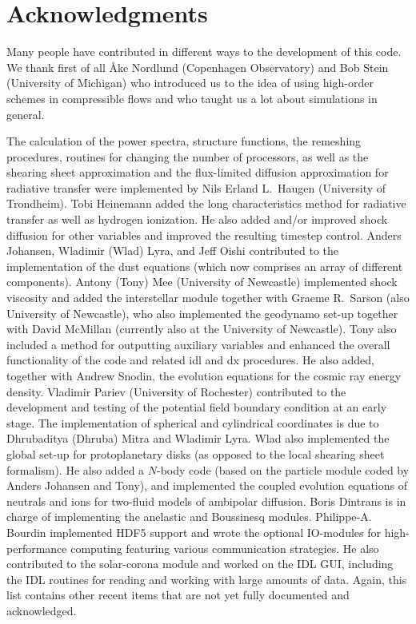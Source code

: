 \documentclass[\mydriver,12pt,twoside,notitlepage,a4paper]{article}
\begin{document}

\section*{Acknowledgments}

Many people have contributed in different ways to the development of this
code. We thank first of all {\AA}ke Nordlund (Copenhagen Observatory)
and Bob Stein (University of Michigan) who introduced us to the idea of
using high-order schemes in compressible flows and who taught us a lot
about simulations in general.

The calculation of the power spectra, structure functions,
the remeshing procedures,
routines for changing the number of processors, as well as
the shearing sheet approximation and the flux-limited diffusion
approximation for radiative transfer
were implemented by Nils Erland L.\ Haugen (University of Trondheim).
Tobi Heinemann added the long characteristics method for
radiative transfer as well as hydrogen ionization.
He also added and/or improved shock diffusion for other variables
and improved the resulting timestep control.
Anders Johansen, Wladimir (Wlad) Lyra, and Jeff Oishi contributed
to the implementation of
the dust equations (which now comprises an array of different components).
Antony (Tony) Mee (University of Newcastle) implemented shock viscosity
and added the interstellar module together with
Graeme R.\ Sarson (also University of Newcastle), who also implemented
the geodynamo set-up together with David McMillan
(currently also at the University of Newcastle).
Tony also included a method for outputting auxiliary variables and
enhanced the overall functionality of the code and related idl and dx
procedures.
He also added, together with Andrew Snodin, the evolution equations
for the cosmic ray energy density.
Vladimir Pariev (University of Rochester) contributed to the development
and testing of the potential field boundary condition at an early stage.
The implementation of spherical and cylindrical coordinates is due
to Dhrubaditya (Dhruba) Mitra and Wladimir Lyra. Wlad also
implemented the global set-up for protoplanetary
disks (as opposed to the local shearing sheet formalism). He also added a
$N$-body code (based on the particle module coded by Anders Johansen
and Tony), and implemented the coupled evolution equations of neutrals and
ions for two-fluid models of ambipolar diffusion.
Boris Dintrans is in charge of implementing the anelastic and Boussinesq modules.
Philippe-A. Bourdin implemented HDF5 support and wrote the optional IO-modules
for high-performance computing featuring various communication strategies.
He also contributed to the solar-corona module and worked on the IDL GUI,
including the IDL routines for reading and working with large amounts of data.
Again, this list contains other recent items that are not yet fully
documented and acknowledged.
\end{document}
